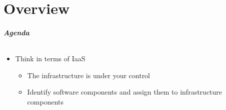 \part{Overview}

\begin{frame}
\frametitle{Agenda}
\framesubtitle{}
\begin{itemize}
\item Think in terms of IaaS
  \begin{itemize}
  \item The infrastructure is under your control
  \item Identify software components and assign them to infrastructure components
  \end{itemize}
\end{itemize}
\end{frame}
